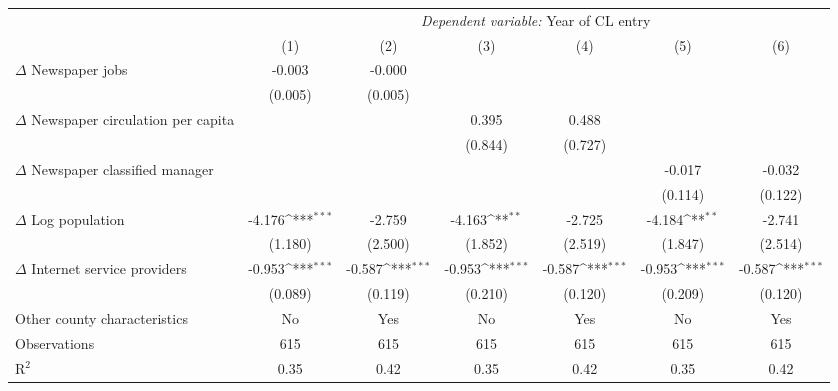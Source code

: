 {
\def\sym#1{\ifmmode^{#1}\else\(^{#1}\)\fi}
\begin{tabular}{l*{6}{c}}
\toprule
                    &\multicolumn{6}{c}{\textit{Dependent variable:} Year of CL entry}                                                                  \\\cmidrule(lr){2-7}
                    &\multicolumn{1}{c}{(1)}         &\multicolumn{1}{c}{(2)}         &\multicolumn{1}{c}{(3)}         &\multicolumn{1}{c}{(4)}         &\multicolumn{1}{c}{(5)}         &\multicolumn{1}{c}{(6)}         \\
\midrule
$\Delta$ Newspaper jobs&      -0.003         &      -0.000         &                     &                     &                     &                     \\
                    &     (0.005)         &     (0.005)         &                     &                     &                     &                     \\
\addlinespace
$\Delta$ Newspaper circulation per capita&                     &                     &       0.395         &       0.488         &                     &                     \\
                    &                     &                     &     (0.844)         &     (0.727)         &                     &                     \\
\addlinespace
$\Delta$ Newspaper classified manager&                     &                     &                     &                     &      -0.017         &      -0.032         \\
                    &                     &                     &                     &                     &     (0.114)         &     (0.122)         \\
\addlinespace
$\Delta$ Log population&      -4.176\sym{***}&      -2.759         &      -4.163\sym{**} &      -2.725         &      -4.184\sym{**} &      -2.741         \\
                    &     (1.180)         &     (2.500)         &     (1.852)         &     (2.519)         &     (1.847)         &     (2.514)         \\
\addlinespace
$\Delta$ Internet service providers&      -0.953\sym{***}&      -0.587\sym{***}&      -0.953\sym{***}&      -0.587\sym{***}&      -0.953\sym{***}&      -0.587\sym{***}\\
                    &     (0.089)         &     (0.119)         &     (0.210)         &     (0.120)         &     (0.209)         &     (0.120)         \\
\addlinespace
Other county characteristics &          No         &         Yes         &          No         &         Yes         &          No         &         Yes         \\
\midrule
Observations        &         615         &         615         &         615         &         615         &         615         &         615         \\
R$^2$               &        0.35         &        0.42         &        0.35         &        0.42         &        0.35         &        0.42         \\
\bottomrule
\end{tabular}
}
